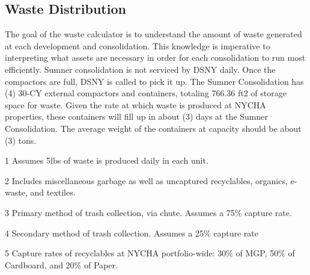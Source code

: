 \textcolor{ccorange}{\section{Waste Distribution}}

The goal of the waste calculator is to understand the amount of waste generated at each development and consolidation. This knowledge is imperative to interpreting what assets are necessary in order for each consolidation to run most efficiently. Sumner consolidation is not serviced by DSNY daily. Once the compactors are full, DSNY is called to pick it up. The Sumner Consolidation has (4) 30-CY external compactors and containers, totaling 766.36 ft2 of storage space for waste. Given the rate at which waste is produced at NYCHA properties, these containers will fill up in about (3) days at the Sumner Consolidation. The average weight of the containers at capacity should be about (3) tons.

\begin{table}[H]
\begin{threeparttable}
\small



\begin{tablenotes}
\item [1] Assumes 5lbs of waste is produced daily in each unit.
\item [2] Includes miscellaneous garbage as well as uncaptured recyclables, organics, e-waste, and textiles.
\item [3] Primary method of trash collection, via chute. Assumes a 75\% capture rate.
\item [4] Secondary method of trash collection. Assumes a 25\% capture rate
\item [5] Capture rates of recyclables at NYCHA portfolio-wide: 30\% of MGP, 50\% of Cardboard, and 20\% of Paper. 
\end{tablenotes}
\end{threeparttable}
\end{table}
\pagebreak

